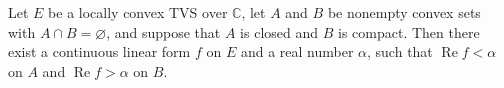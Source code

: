 Let $E$ be a locally convex TVS over $\mathbb{C}$, let $A$ and $B$ be nonempty convex sets with $A \cap B = \varnothing$, and suppose that $A$ is closed and $B$ is compact. Then there exist a continuous linear form $f$ on $E$ and a real number $\alpha$, such that $\operatorname{Re} f < \alpha$ on $A$ and $\operatorname{Re} f > \alpha$ on $B$.